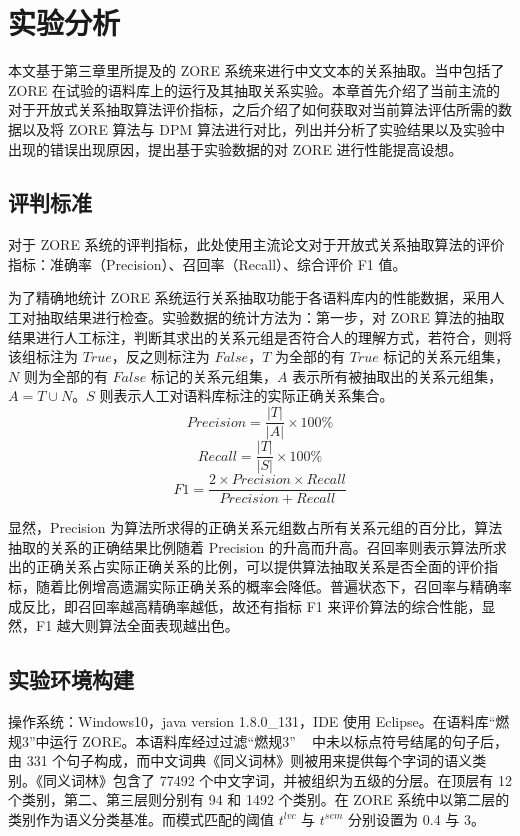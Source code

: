 \chapter{实验分析}
本文基于第三章里所提及的 ZORE 系统来进行中文文本的关系抽取。当中包括了 ZORE 在试验的语料库上的运行及其抽取关系实验。本章首先介绍了当前主流的对于开放式关系抽取算法评价指标，之后介绍了如何获取对当前算法评估所需的数据以及将 ZORE 算法与 DPM 算法进行对比，列出并分析了实验结果以及实验中出现的错误出现原因，提出基于实验数据的对 ZORE 进行性能提高设想。
\section{评判标准}对于 ZORE 系统的评判指标，此处使用主流论文对于开放式关系抽取算法的评价指标：准确率（Precision）、召回率（Recall）、综合评价 F1 值。

为了精确地统计 ZORE 系统运行关系抽取功能于各语料库内的性能数据，采用人工对抽取结果进行检查。实验数据的统计方法为：第一步，对 ZORE 算法的抽取结果进行人工标注，判断其求出的关系元组是否符合人的理解方式，若符合，则将该组标注为 $True$，反之则标注为 $False$，$T$ 为全部的有 $True$ 标记的关系元组集，$N$ 则为全部的有 $False$ 标记的关系元组集，$A$ 表示所有被抽取出的关系元组集，$A=T\cup N$。$S$ 则表示人工对语料库标注的实际正确关系集合。
    \begin{equation}
        Precision=\frac{|T|}{|A|}\times 100\%
    \end{equation}
    \begin{equation}
        Recall=\frac{|T|}{|S|}\times 100\%
    \end{equation}
    \begin{equation}
        F1=\frac{2\times Precision\times Recall}{Precision+Recall}
    \end{equation}

显然，Precision 为算法所求得的正确关系元组数占所有关系元组的百分比，算法抽取的关系的正确结果比例随着 Precision 的升高而升高。召回率则表示算法所求出的正确关系占实际正确关系的比例，可以提供算法抽取关系是否全面的评价指标，随着比例增高遗漏实际正确关系的概率会降低。普遍状态下，召回率与精确率成反比，即召回率越高精确率越低，故还有指标 F1 来评价算法的综合性能，显然，F1 越大则算法全面表现越出色。

\section{实验环境构建}
操作系统：Windows10，java version 1.8.0\_131，IDE 使用 Eclipse。在语料库“燃规3”中运行 ZORE。本语料库经过过滤“燃规3” ~\citep{rangui3} 中未以标点符号结尾的句子后，由 331 个句子构成，而中文词典《同义词林》\citep{che2005}则被用来提供每个字词的语义类别。《同义词林》包含了 77492 个中文字词，并被组织为五级的分层。在顶层有 12 个类别，第二、第三层则分别有 94 和 1492 个类别。在 ZORE 系统中以第二层的类别作为语义分类基准。而模式匹配的阈值 $t^{lvc}$ 与 $t^{sem}$ 分别设置为 0.4 与 3。

